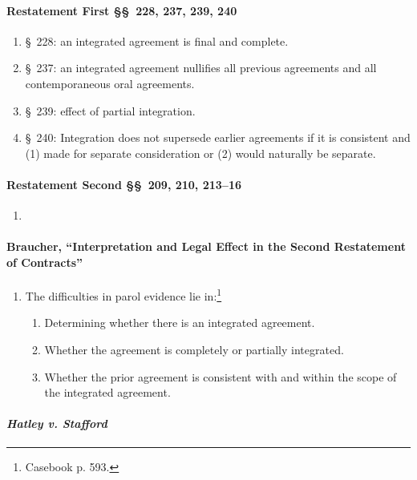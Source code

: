 \paragraph{Restatement First \S\S\ 228, 237, 239, 240}

\begin{enumerate}
    \item \S\ 228: an integrated agreement is final and complete.
    \item \S\ 237: an integrated agreement nullifies all previous agreements 
    and all contemporaneous oral agreements.
    \item \S\ 239: effect of partial integration. %
    \item \S\ 240: Integration does not supersede earlier agreements if it is 
    consistent and (1) made for separate consideration or (2) would naturally 
    be separate.
\end{enumerate}

\paragraph{Restatement Second \S\S\ 209, 210, 213--16}

\begin{enumerate}
    \item %
\end{enumerate}

\paragraph{Braucher, ``Interpretation and Legal Effect in the Second 
Restatement of Contracts''}

\begin{enumerate}
    \item The difficulties in parol evidence lie in:\footnote{Casebook p. 
    593.}
    \begin{enumerate}
        \item Determining whether there is an integrated agreement.
        \item Whether the agreement is completely or partially integrated.
        \item Whether the prior agreement is consistent with and within the 
        scope of the integrated agreement.
    \end{enumerate}
\end{enumerate}

\paragraph{\emph{Hatley v. Stafford}}


